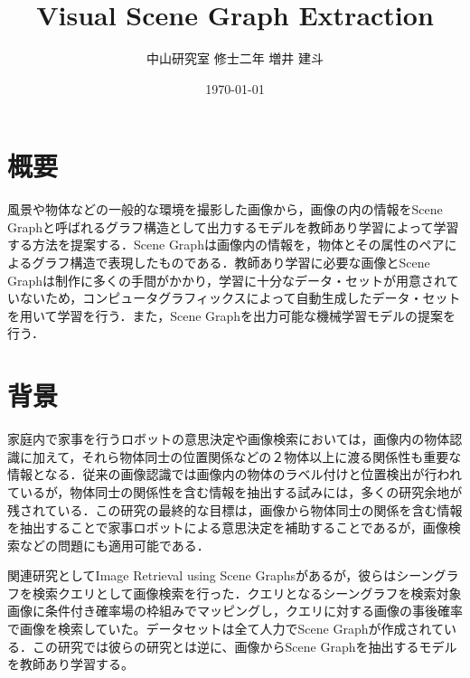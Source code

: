 

\title{Visual Scene Graph Extraction}
\author{中山研究室 修士二年 増井 建斗}
\date{\today}

\maketitle


\section{概要}
風景や物体などの一般的な環境を撮影した画像から，画像の内の情報をScene Graph\cite{scene_graph}と呼ばれるグラフ構造として出力するモデルを教師あり学習によって学習する方法を提案する．Scene Graphは画像内の情報を，物体とその属性のペアによるグラフ構造で表現したものである．教師あり学習に必要な画像とScene Graphは制作に多くの手間がかかり，学習に十分なデータ・セットが用意されていないため，コンピュータグラフィックスによって自動生成したデータ・セットを用いて学習を行う．また，Scene Graphを出力可能な機械学習モデルの提案を行う．

\section{背景}
家庭内で家事を行うロボットの意思決定や画像検索においては，画像内の物体認識に加えて，それら物体同士の位置関係などの２物体以上に渡る関係性も重要な情報となる．従来の画像認識では画像内の物体のラベル付けと位置検出が行われているが，物体同士の関係性を含む情報を抽出する試みには，多くの研究余地が残されている．この研究の最終的な目標は，画像から物体同士の関係を含む情報を抽出することで家事ロボットによる意思決定を補助することであるが，画像検索などの問題にも適用可能である．

関連研究としてImage Retrieval using Scene Graphs\cite{scene_graph}があるが，彼らはシーングラフを検索クエリとして画像検索を行った．クエリとなるシーングラフを検索対象画像に条件付き確率場の枠組みでマッピングし，クエリに対する画像の事後確率で画像を検索していた。データセットは全て人力でScene Graphが作成されている．この研究では彼らの研究とは逆に、画像からScene Graphを抽出するモデルを教師あり学習する。

